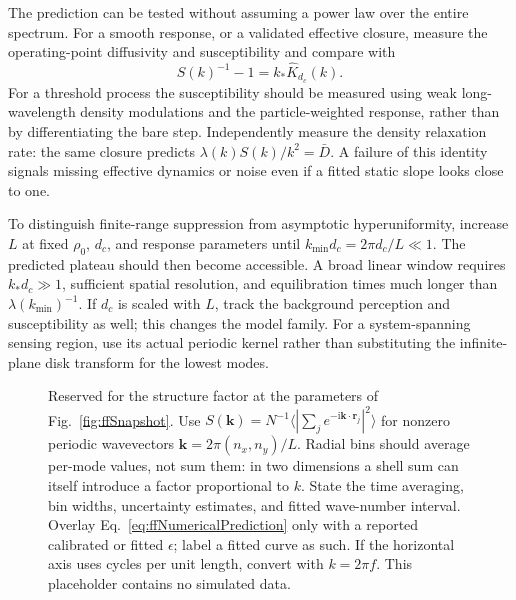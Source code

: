 \documentclass{article}
\begin{document}
The prediction can be tested without assuming a power law over the entire spectrum. For a smooth response, or a validated effective closure, measure the operating-point diffusivity and susceptibility and compare with
\begin{equation}
    \boxed{S(k)^{-1}-1=k_*\widehat K_{d_c}(k).}
    \label{eq:ffFitTest}
\end{equation}
For a threshold process the susceptibility should be measured using weak long-wavelength density modulations and the particle-weighted response, rather than by differentiating the bare step. Independently measure the density relaxation rate: the same closure predicts $\lambda(k)S(k)/k^2=\bar D$. A failure of this identity signals missing effective dynamics or noise even if a fitted static slope looks close to one.

To distinguish finite-range suppression from asymptotic hyperuniformity, increase $L$ at fixed $\rho_0$, $d_c$, and response parameters until $k_{\min}d_c=2\pi d_c/L\ll1$. The predicted plateau should then become accessible. A broad linear window requires $k_*d_c\gg1$, sufficient spatial resolution, and equilibration times much longer than $\lambda(k_{\min})^{-1}$. If $d_c$ is scaled with $L$, track the background perception and susceptibility as well; this changes the model family. For a system-spanning sensing region, use its actual periodic kernel rather than substituting the infinite-plane disk transform for the lowest modes.

\begin{figure}[htbp]
    \centering
    \caption{Reserved for the structure factor at the parameters of Fig.~\ref{fig:ffSnapshot}. Use $S(\mathbf k)=N^{-1}\langle|\sum_j e^{-\mathrm i\mathbf k\cdot\mathbf r_j}|^2\rangle$ for nonzero periodic wavevectors $\mathbf k=2\pi(n_x,n_y)/L$. Radial bins should average per-mode values, not sum them: in two dimensions a shell sum can itself introduce a factor proportional to $k$. State the time averaging, bin widths, uncertainty estimates, and fitted wave-number interval. Overlay Eq.~\eqref{eq:ffNumericalPrediction} only with a reported calibrated or fitted $\epsilon$; label a fitted curve as such. If the horizontal axis uses cycles per unit length, convert with $k=2\pi f$. This placeholder contains no simulated data.}
    \label{fig:ffStructureFactor}
\end{figure}
\end{document}
